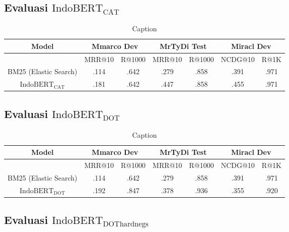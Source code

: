 \subsection{Evaluasi $\text{IndoBERT}_{\text{CAT}}$}
\label{sec:resultindobertcat}

\begin{table}
    \centering
    \caption{Caption}
    \label{tab:indobertcat}
    \begin{tabular}{|c|cc|cc|cc|} \hline 
         Model&  \multicolumn{2}{|c|}{Mmarco Dev}& 
         \multicolumn{2}{|c|}{MrTyDi Test}&  \multicolumn{2}{|c|}{Miracl Dev}\\ \hline 
            & MRR@10 & R@1000 & MRR@10 & R@1000 & NCDG@10 & R@1K\\ \hline 
            BM25 (Elastic Search) & .114 & .642 & .279 & .858 & .391 & .971\\ \hline
            $\text{IndoBERT}_{\text{CAT}}$ & .181 & .642 & .447 & .858 & .455 & .971\\ \hline
    \end{tabular}    
    \label{tab:my_label}
\end{table}


\subsection{Evaluasi $\text{IndoBERT}_{\text{DOT}}$}
\label{sec:resultindobertdot}

\begin{table}
    \centering
    \caption{Caption}
    \label{tab:indobertdot}
    \begin{tabular}{|c|cc|cc|cc|} \hline 
         Model&  \multicolumn{2}{|c|}{Mmarco Dev}& 
         \multicolumn{2}{|c|}{MrTyDi Test}&  \multicolumn{2}{|c|}{Miracl Dev}\\ \hline 
            & MRR@10 & R@1000 & MRR@10 & R@1000 & NCDG@10 & R@1K\\ \hline 
            BM25 (Elastic Search) & .114 & .642 & .279 & .858 & .391 & .971\\ \hline
            $\text{IndoBERT}_{\text{DOT}}$ & .192 & .847 & .378 & .936 & .355 & .920\\ \hline
    \end{tabular}
    
\end{table}

\subsection{Evaluasi $\text{IndoBERT}_{\text{DOThardnegs}}$}
\label{sec:resultindobertdothardnegs}

